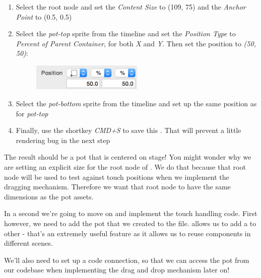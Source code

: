 \begin{leftbar}
\begin{enumerate}
  \item Select the root node and set the \textit{Content Size} to (109, 75) and
  the \textit{Anchor Point} to (0.5, 0.5)
  \item Select the \textit{pot-top} sprite from the timeline and set the
  \textit{Position Type} to \textit{Percent of Parent Container}, for both
  \textit{X} and \textit{Y}. Then set the position to \textit{(50, 50)}:
  \begin{figure}[H]
    \centering
    \includegraphics[width=150pt]{images/Chapter3/pot_top_position.png}
  \end{figure}
  \item Select the \textit{pot-bottom} sprite from the timeline and set up the
  same position as for \textit{pot-top}
  \item Finally, use the shortkey \textit{CMD+S} to save this \ccbfile{}. That
  will prevent a little rendering bug in the next step
\end{enumerate}
\end{leftbar}

The result should be a pot that is centered on stage! You might wonder why we
are setting an explicit size for the root node of . We do
that because that root node will be used to test against touch positions when we
implement the dragging mechanism. Therefore we want that root node to have the
same dimensions as the pot assets.

In a second we're going to move on and implement the touch handling code. First
however, we need to add the pot that we created to the
 file. \SB{} allows us to add a \ccbfile{} to other
\ccbfile{} - that's an extremely useful feature as it allows us to reuse
components in different scenes.

We'll also need to set up a code connection, so that we can access the pot
from our codebase when implementing the drag and drop mechanism later on!

